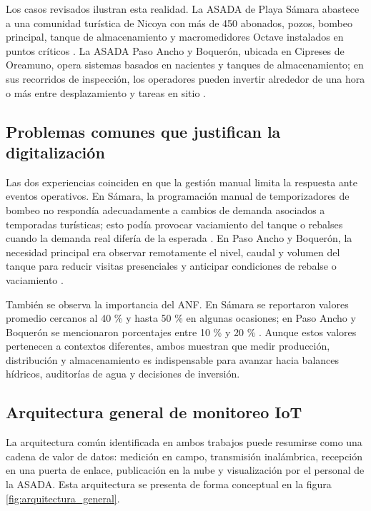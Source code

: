 \documentclass[12pt,letterpaper]{article}
\begin{document}
Los casos revisados ilustran esta realidad. La ASADA de Playa Sámara abastece a una comunidad turística de Nicoya con más de 450 abonados, pozos, bombeo principal, tanque de almacenamiento y macromedidores Octave instalados en puntos críticos \cite{solorzano2021}. La ASADA Paso Ancho y Boquerón, ubicada en Cipreses de Oreamuno, opera sistemas basados en nacientes y tanques de almacenamiento; en sus recorridos de inspección, los operadores pueden invertir alrededor de una hora o más entre desplazamiento y tareas en sitio \cite{oviedo2024}.

\subsection{Problemas comunes que justifican la digitalización}
Las dos experiencias coinciden en que la gestión manual limita la respuesta ante eventos operativos. En Sámara, la programación manual de temporizadores de bombeo no respondía adecuadamente a cambios de demanda asociados a temporadas turísticas; esto podía provocar vaciamiento del tanque o rebalses cuando la demanda real difería de la esperada \cite{solorzano2021}. En Paso Ancho y Boquerón, la necesidad principal era observar remotamente el nivel, caudal y volumen del tanque para reducir visitas presenciales y anticipar condiciones de rebalse o vaciamiento \cite{oviedo2024}.

También se observa la importancia del ANF. En Sámara se reportaron valores promedio cercanos al 40 \% y hasta 50 \% en algunas ocasiones; en Paso Ancho y Boquerón se mencionaron porcentajes entre 10 \% y 20 \% \cite{solorzano2021,oviedo2024}. Aunque estos valores pertenecen a contextos diferentes, ambos muestran que medir producción, distribución y almacenamiento es indispensable para avanzar hacia balances hídricos, auditorías de agua y decisiones de inversión.

\subsection{Arquitectura general de monitoreo IoT}
La arquitectura común identificada en ambos trabajos puede resumirse como una cadena de valor de datos: medición en campo, transmisión inalámbrica, recepción en una puerta de enlace, publicación en la nube y visualización por el personal de la ASADA. Esta arquitectura se presenta de forma conceptual en la figura \ref{fig:arquitectura_general}.
\end{document}
